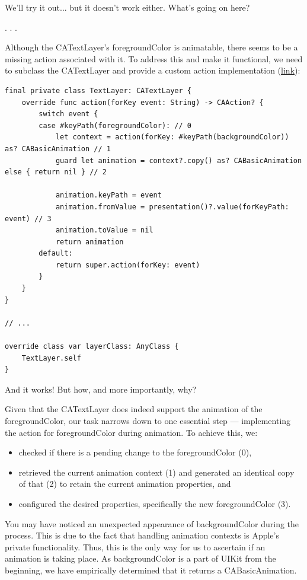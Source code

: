 \documentclass{article}
\newcommand{\separator}{\vspace{5mm}\centerline{. . .}\vspace{5mm}}
\begin{document}
We'll try it out... but it doesn't work either. What's going on here? 

\separator

Although the CATextLayer's foregroundColor is animatable, there seems to be a missing action associated with it. To address this and make it functional, we need to subclass the CATextLayer and provide a custom action implementation (\href{https://github.com/stateman92/Medium-AnimatableProperties/commit/1eeb39fbaf045eda34697ebc7a45d8dc23a368e9}{link}):

\begin{lstlisting}
final private class TextLayer: CATextLayer {
    override func action(forKey event: String) -> CAAction? {
        switch event {
        case #keyPath(foregroundColor): // 0
            let context = action(forKey: #keyPath(backgroundColor)) as? CABasicAnimation // 1
            guard let animation = context?.copy() as? CABasicAnimation else { return nil } // 2

            animation.keyPath = event
            animation.fromValue = presentation()?.value(forKeyPath: event) // 3
            animation.toValue = nil
            return animation
        default:
            return super.action(forKey: event)
        }
    }
}

// ...

override class var layerClass: AnyClass {
    TextLayer.self
}
\end{lstlisting}

And it works!  But how, and more importantly, why?

Given that the CATextLayer does indeed support the animation of the foregroundColor, our task narrows down to one essential step — implementing the action for foregroundColor during animation. To achieve this, we:

\begin{itemize}
  \item checked if there is a pending change to the foregroundColor (0),
  \item retrieved the current animation context (1) and generated an identical copy of that (2) to retain the current animation properties, and
  \item configured the desired properties, specifically the new foregroundColor (3).
\end{itemize}

\begin{displayquote}
You may have noticed an unexpected appearance of backgroundColor during the process. This is due to the fact that handling animation contexts is Apple's private functionality. Thus, this is the only way for us to ascertain if an animation is taking place. As backgroundColor is a part of UIKit from the beginning, we have empirically determined that it returns a CABasicAnimation.
\end{displayquote}
\end{document}

